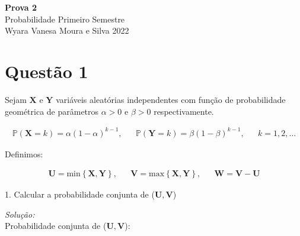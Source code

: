 \documentclass[a4paper, 11pt]{article}
\begin{document}
\noindent
{\Large\textbf{Prova 2} \hfill \\
Probabilidade \hfill Primeiro Semestre\\
Wyara Vanesa Moura e Silva \hfill 2022\\}

\section*{Questão 1} Sejam $\boldsymbol{X}$ e $\boldsymbol{Y}$ variáveis aleatórias independentes com função de probabilidade geométrica de parâmetros $\alpha > 0$ e $\beta > 0$ respectivamente.

\begin{equation*}
\begin{array}{lclll}
\mathds{P}(\mathbf{X} = k) = \alpha(1-\alpha)^{k-1}, &  & \mathds{P}(\mathbf{Y} = k) = \beta(1-\beta)^{k-1}, &  & k = 1,2,\ldots
\end{array}
\end{equation*}

Definimos:

\begin{equation*}
\begin{array}{lclll}
\mathbf{U} = \mathrm{min}\left\{ \mathbf{X}, \mathbf{Y} \right\}, &  & \mathbf{V} = \mathrm{max}\left\{ \mathbf{X}, \mathbf{Y} \right\}, &  & \mathbf{W} = \mathbf{V} - \mathbf{U}
\end{array}
\end{equation*}

1. Calcular a probabilidade conjunta de ($\mathbf{U}, \mathbf{V}$)

\noindent
\textit{Solução:} \\

Probabilidade conjunta de ($\mathbf{U}, \mathbf{V}$):
\end{document}

